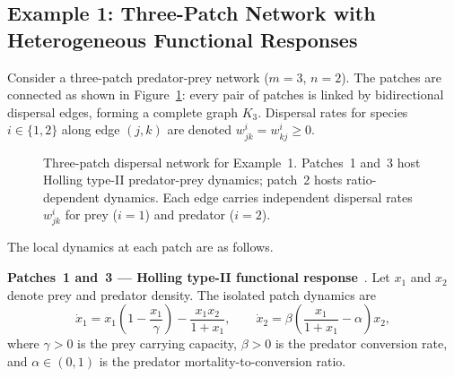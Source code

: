 \documentclass[12pt,a4paper]{article}
\theoremstyle{definition}
\begin{document}
\subsection*{Example 1: Three-Patch Network with Heterogeneous Functional Responses}
\label{subsec:ex1}

Consider a three-patch predator-prey network ($m = 3$, $n = 2$).
The patches are connected as shown in Figure~\ref{fig:3patch}: every
pair of patches is linked by bidirectional dispersal edges, forming a
complete graph $K_3$.
Dispersal rates for species $i \in \{1,2\}$ along edge $(j,k)$ are
denoted $w^i_{jk} = w^i_{kj} \geq 0$.

\begin{figure}[ht]
\centering
{}
\caption{Three-patch dispersal network for Example~1.
  Patches~1 and~3 host Holling type-II predator-prey dynamics;
  patch~2 hosts ratio-dependent dynamics.
  Each edge carries independent dispersal rates $w^i_{jk}$ for
  prey ($i=1$) and predator ($i=2$).}
\label{fig:3patch}
\end{figure}

\medskip
The local dynamics at each patch are as follows.

\medskip
\noindent\textbf{Patches~1 and~3 --- Holling type-II functional
response}~\cite{kot2001}.
Let $x_1$ and $x_2$ denote prey and predator density.
The isolated patch dynamics are
\begin{equation*}
  \dot{x}_1 = x_1\!\left(1 - \frac{x_1}{\gamma}\right)
              - \frac{x_1 x_2}{1 + x_1},
  \qquad
  \dot{x}_2 = \beta\!\left(\frac{x_1}{1+x_1} - \alpha\right)\!x_2,
  \label{eq:holling2}
\end{equation*}
where $\gamma > 0$ is the prey carrying capacity, $\beta > 0$ is the
predator conversion rate, and $\alpha \in (0,1)$ is the predator
mortality-to-conversion ratio.
\end{document}
